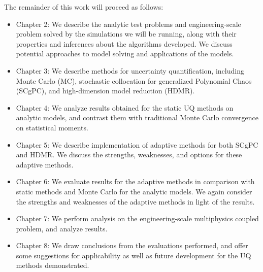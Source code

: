 The remainder of this work will proceed as follows:
\begin{itemize}
  \item Chapter 2: We describe the analytic test problems and engineering-scale problem solved by the simulations 
    we will be running, along with their properties and inferences about the algorithms developed.
    We discuss potential approaches to model solving and applications of the models.
  \item Chapter 3: We describe methods for uncertainty quantification, including Monte Carlo (MC),
    stochastic collocation for generalized Polynomial Chaos (SCgPC), and high-dimension model reduction (HDMR).
  \item Chapter 4: We analyze results obtained for the static UQ methods on analytic models, and contrast 
    them with traditional Monte Carlo convergence on statistical moments.
  \item Chapter 5: We describe implementation of adaptive methods for both SCgPC and HDMR.  We discuss the
    strengths, weaknesses, and options for these adaptive methods.
  \item Chapter 6: We evaluate results for the adaptive methods in comparison with static methods and Monte
    Carlo for the analytic models.  We again consider the strengths and weaknesses of the adaptive methods in 
    light of the results. 
  \item Chapter 7: We perform analysis on the engineering-scale multiphysics coupled problem, and analyze
    results.
  \item Chapter 8: We draw conclusions from the evaluations performed, and offer some suggestions for
    applicability as well as future development for the UQ methods demonstrated.
\end{itemize}
